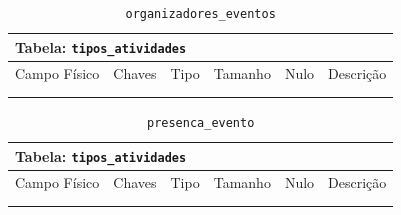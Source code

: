 \documentclass[12pt,a4paper]{article}
\begin{document}
\begin{center}
\begin{table}[h!]
	\caption{\texttt{organizadores\_eventos}}
	\label{tabela:organizadoresEventos}
	\begin{tabular}{|p{2.5cm}|p{1cm}|p{1.25cm}|p{1.75cm}|p{1.25cm}|p{5cm}|}\hline	
		\multicolumn{6}{|p{16cm}|}{\cellcolor{cinzaClaro}  \centering Tabela: \texttt{tipos\_atividades}} \\ \hline %
		{\small Campo Físico}   & {\small Chaves} & {\small Tipo} & {\small Tamanho} & {\small Nulo} & {\small Descrição}\\\hline %
		
		{\tiny } & {\tiny } & {\tiny } & {\tiny } & {\tiny } &{\tiny }\\\hline
		{\tiny } & {\tiny } & {\tiny } & {\tiny } & {\tiny } &{\tiny }\\\hline
			
	\end{tabular}
\end{table}	
\end{center}


\begin{center}
\begin{table}[h!]
	\caption{\texttt{presenca\_evento}}
	\label{tabela:presencaEvento}
	\begin{tabular}{|p{2.5cm}|p{1cm}|p{1.25cm}|p{1.75cm}|p{1.25cm}|p{5cm}|}\hline	
		\multicolumn{6}{|p{16cm}|}{\cellcolor{cinzaClaro}  \centering Tabela: \texttt{tipos\_atividades}} \\ \hline %
		{\small Campo Físico}   & {\small Chaves} & {\small Tipo} & {\small Tamanho} & {\small Nulo} & {\small Descrição}\\\hline %
		
		{\tiny }  & {\tiny } & {\tiny } & {\tiny } & {\tiny } &{\tiny }\\\hline
		{\tiny }  & {\tiny } & {\tiny } & {\tiny } & {\tiny } &{\tiny }\\\hline
			
	\end{tabular}
\end{table}	
\end{center}
\end{document}

